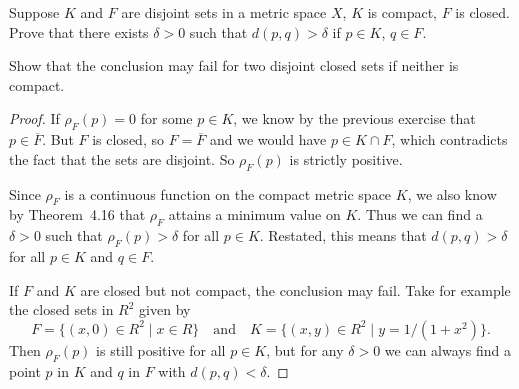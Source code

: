  Suppose $K$ and $F$ are disjoint sets in a metric space
$X$, $K$ is compact, $F$ is closed. Prove that there exists
$\delta > 0$ such that $d(p,q) > \delta$ if $p\in K$, $q\in F$.

Show that the conclusion may fail for two disjoint closed sets if
neither is compact.
\begin{proof}
  If $\rho_F(p) = 0$ for some $p\in K$, we know by the previous
  exercise that $p\in\overline{F}$. But $F$ is closed, so
  $F = \overline{F}$ and we would have $p\in K\cap F$, which
  contradicts the fact that the sets are disjoint. So $\rho_F(p)$ is
  strictly positive.

  Since $\rho_F$ is a continuous function on the compact metric space
  $K$, we also know by Theorem~4.16 that $\rho_F$ attains a minimum
  value on $K$. Thus we can find a $\delta > 0$ such that
  $\rho_F(p)>\delta$ for all $p\in K$. Restated, this means that
  $d(p,q) > \delta$ for all $p\in K$ and $q\in F$.

  If $F$ and $K$ are closed but not compact, the conclusion may
  fail. Take for example the closed sets in $R^2$ given by
  \begin{equation*}
    F = \{(x,0)\in R^2\mid x\in R\}
    \quad\text{and}\quad
    K = \{(x,y)\in R^2\mid y = 1/(1 + x^2)\}.
  \end{equation*}
  Then $\rho_F(p)$ is still positive for all $p\in K$, but for any
  $\delta > 0$ we can always find a point $p$ in $K$ and $q$ in $F$
  with $d(p,q) < \delta$.
\end{proof}
